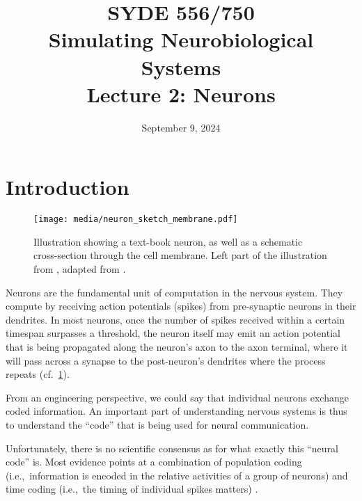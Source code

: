 \documentclass[10pt,letterpaper,oneside]{article}
\date{September 9, 2024}
\title{SYDE 556/750 \\ Simulating Neurobiological Systems \\ Lecture 2: Neurons}
\begin{document}

\section{Introduction}


\begin{figure}[b]
	\centering
	\texttt{[image: media/neuron\_sketch\_membrane.pdf]}
	\caption{Illustration showing a text-book neuron, as well as a schematic cross-section through the cell membrane. Left part of the illustration from \cite{stoeckel2015design}, adapted from \cite{kandel2012principles}.}
	\label{fig:neuron_sketch_membrane}
\end{figure}

Neurons are the fundamental unit of computation in the nervous system. They compute by receiving action potentials (spikes) from pre-synaptic neurons in their dendrites. In most neurons, once the number of spikes received within a certain timespan surpasses a threshold, the neuron itself may emit an action potential that is being propagated along the neuron's axon to the axon terminal, where it will pass across a synapse to the post-neuron's dendrites where the process repeats (cf.~\cref{fig:neuron_sketch_membrane}).

From an engineering perspective, we could say that individual neurons exchange coded information. An important part of understanding nervous systems is thus to understand the \enquote{code} that is being used for neural communication.

Unfortunately, there is no scientific consensus as for what exactly this \enquote{neural code} is. Most evidence points at a combination of population coding (i.e.,~information is encoded in the relative activities of a group of neurons) and time coding (i.e.,~the timing of individual spikes matters) \cite{rieke1999spikes}.

\end{document}
